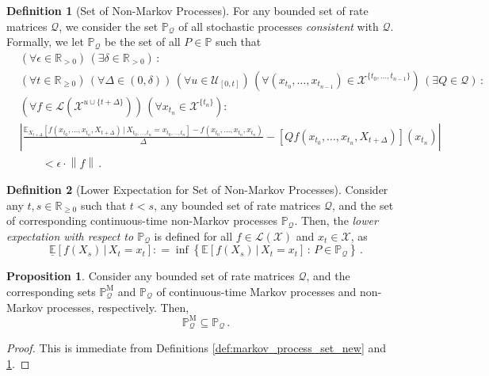 \documentclass[10pt]{paper}
\theoremstyle{definition}
\newtheorem{proposition}[theorem]{Proposition}
\newtheorem{definition}{Definition}
\newcommand{\reals}{\mathbb{R}}
\newcommand{\realspos}{\reals_{>0}}
\newcommand{\realsnonneg}{\reals_{\geq 0}}
\newcommand{\states}{\mathcal{X}}
\newcommand{\processes}{\mathbb{P}}
\newcommand{\mprocesses}{\processes^{\mathrm{M}}}
\newcommand{\gambles}{\mathcal{L}}
\newcommand{\gamblesX}{\gambles(\states)}
\newcommand{\rateset}{\mathcal{Q}}
\newcommand{\norm}[1]{\left\lVert #1 \right\rVert}
\newcommand{\abs}[1]{\left\vert #1 \right\vert}
\newcommand{\coloneqq}{:\!=}
\begin{document}
\begin{definition}[Set of Non-Markov Processes]\label{def:set_non_markov_process}
For any bounded set of rate matrices $\rateset$, we consider the set $\processes_\rateset$ of all stochastic processes \emph{consistent} with $\rateset$. Formally, we let $\processes_\rateset$ be the set of all $P\in\processes$ such that
\begin{align*}
&(\forall\epsilon\in\realspos)\,(\exists\delta\in\realspos)\,: \\
 &(\forall t\in\realsnonneg)\,(\forall\Delta\in(0,\delta))\,(\forall u\in\mathcal{U}_{[0,t]})\,(\forall(x_{t_0},\ldots,x_{t_{n-1}})\in\states^{\{t_0,\ldots,t_{n-1}\}})\,(\exists Q\in\rateset)\,: \\
 &(\forall f\in\gambles(\states^{u\cup\{t+\Delta\}}))\,(\forall x_{t_n}\in\states^{\{t_n\}}): \\
 &\abs{\frac{\mathbb{E}_{X_{t+\Delta}}[f(x_{t_0},\ldots,x_{t_n},X_{t+\Delta})\,\vert\,X_{t_0,\ldots,t_n}=x_{t_0,\ldots,t_n}] - f(x_{t_0},\ldots,x_{t_n},x_{t_n})}{\Delta} - \left[Q f(x_{t_0},\ldots,x_{t_{n}},X_{t+\Delta})\right](x_{t_n})} \\ 
 &\quad\quad < \epsilon\cdot\norm{f}\,.
\end{align*}
\end{definition}

\begin{definition}[Lower Expectation for Set of Non-Markov Processes]\label{def:lower_non_markov} Consider any $t,s\in\realsnonneg$ such that $t<s$, any bounded set of rate matrices $\rateset$, and the set of corresponding continuous-time non-Markov processes $\processes_\rateset$. Then, the \emph{lower expectation with respect to $\processes_\rateset$} is defined for all $f\in\gamblesX$ and $x_t\in\states$, as
\begin{equation*}
\underline{\mathbb{E}}[f(X_s)\,\vert\,X_t=x_t] \coloneqq \inf\left\{\mathbb{E}[f(X_s)\,\vert\,X_t=x_t]\,:\,P\in\processes_\rateset\right\}\,.
\end{equation*}
\end{definition}

\begin{proposition}\label{prop:markov_set_subset_of_nonmarkov_set}
Consider any bounded set of rate matrices $\rateset$, and the corresponding sets $\mprocesses_\rateset$ and $\processes_\rateset$ of continuous-time Markov processes and non-Markov processes, respectively. Then,
\begin{equation*}
\mprocesses_\rateset \subseteq \processes_\rateset\,.
\end{equation*}
\end{proposition}
\begin{proof}
This is immediate from Definitions \ref{def:markov_process_set_new} and \ref{def:set_non_markov_process}.
\end{proof}
\end{document}
